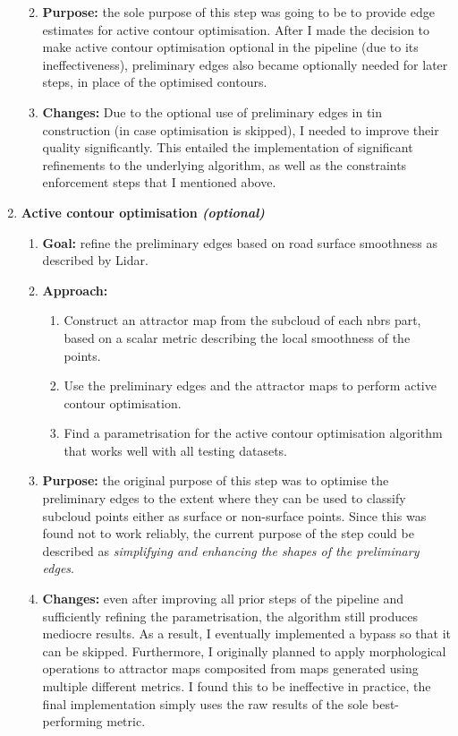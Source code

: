 \begin{enumerate}
\begin{enumerate}
\begin{enumerate}
        \end{enumerate}
        \item \textbf{Purpose:} the sole purpose of this step was going to be to provide edge estimates for active contour optimisation. After I made the decision to make active contour optimisation optional in the pipeline (due to its ineffectiveness), preliminary edges also became optionally needed for later steps, in place of the optimised contours.
        \item \textbf{Changes:} Due to the optional use of preliminary edges in \ac{tin} construction (in case optimisation is skipped), I needed to improve their quality significantly. This entailed the implementation of significant refinements to the underlying algorithm, as well as the constraints enforcement steps that I mentioned above.
    \end{enumerate}
    \item \textbf{Active contour optimisation \textit{(optional)}}
    \begin{enumerate}
        \item \textbf{Goal:} refine the preliminary edges based on road surface smoothness as described by Lidar.
        \item \textbf{Approach:}
        \begin{enumerate}
            \item Construct an attractor map from the subcloud of each \ac{nbrs} part, based on a scalar metric describing the local smoothness of the points.
            \item Use the preliminary edges and the attractor maps to perform active contour optimisation.
            \item Find a parametrisation for the active contour optimisation algorithm that works well with all testing datasets.
        \end{enumerate}
        \item \textbf{Purpose:} the original purpose of this step was to optimise the preliminary edges to the extent where they can be used to classify subcloud points either as surface or non-surface points. Since this was found not to work reliably, the current purpose of the step could be described as \textit{simplifying and enhancing the shapes of the preliminary edges}.
        \item \textbf{Changes:} even after improving all prior steps of the pipeline and sufficiently refining the parametrisation, the algorithm still produces mediocre results. As a result, I eventually implemented a bypass so that it can be skipped. Furthermore, I originally planned to apply morphological operations to attractor maps composited from maps generated using multiple different metrics. I found this to be ineffective in practice, the final implementation simply uses the raw results of the sole best-performing metric.

\end{enumerate}
\end{enumerate}

